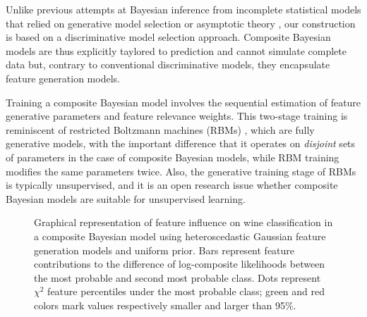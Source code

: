\documentclass[english]{scrartcl}
\begin{document}
Unlike previous attempts at Bayesian inference from incomplete statistical models that relied on generative model selection \cite{Yuan-99b,Wang-14} or asymptotic theory \cite{Pauli-11,Ribatet-12}, our construction is based on a discriminative model selection approach. Composite Bayesian models are thus explicitly taylored to prediction and cannot simulate complete data but, contrary to conventional discriminative models, they encapsulate feature generation models.

Training a composite Bayesian model involves the sequential estimation of feature generative parameters and feature relevance weights. This two-stage training is reminiscent of restricted Boltzmann machines (RBMs) \cite{Hinton-06,Fischer-14}, which are fully generative models, with the important difference that it operates on {\em disjoint} sets of parameters in the case of composite Bayesian models, while RBM training modifies the same parameters twice. Also, the generative training stage of RBMs is typically unsupervised, and it is an open research issue whether composite Bayesian models are suitable for unsupervised learning.

\begin{figure}[!ht]
\begin{center}
\end{center}
\caption{Graphical representation of feature influence on wine classification in a composite Bayesian model using heteroscedastic Gaussian feature generation models and uniform prior. Bars represent feature contributions to the difference of log-composite likelihoods between the most probable and second most probable class. Dots represent $\chi^2$ feature percentiles under the most probable class; green and red colors mark values respectively smaller and larger than 95\%.}
\label{fig:interp}
\end{figure}
\end{document}
